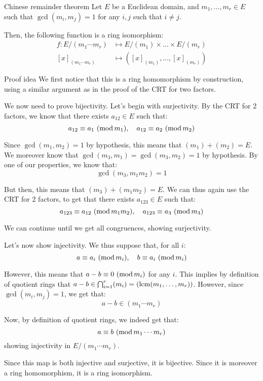 \documentclass[a4paper]{article}
\begin{document}
\begin{parag}{Chinese remainder theorem}
    Let $E$ be a Euclidean domain, and $m_1, \ldots, m_r \in E$ such that $\gcd\left(m_i, m_j\right) = 1$ for any $i, j$ such that $i \neq j$.

    Then, the following function is a ring isomorphism: 
    \[\begin{split}
    f: E / \left(m_1 \cdots m_r\right) &\longmapsto E / \left(m_1\right) \times \ldots \times E / \left(m_r\right) \\
    \left[x\right]_{\left(m_1 \cdots m_r\right)} &\longmapsto \left(\left[x\right]_{\left(m_1\right)}, \ldots, \left[x\right]_{\left(m_r\right)}\right)
    \end{split}\]
    
    \begin{subparag}{Proof idea}
        We first notice that this is a ring homomorphism by construction, using a similar argument as in the proof of the CRT for two factors.

        We now need to prove bijectivity. Let's begin with surjectivity. By the CRT for 2 factors, we know that there exists $a_{12} \in E$ such that: 
        \[a_{12} \equiv a_1\ (\operatorname{mod} m_1), \quad a_{12} \equiv a_2\ (\operatorname{mod} m_2)\]
        
        Since $\gcd\left(m_1, m_2\right) = 1$ by hypothesis, this means that $\left(m_1\right) + \left(m_2\right) = E$. We moreover know that $\gcd\left(m_3, m_1\right) = \gcd\left(m_3, m_2\right) = 1$ by hypothesis. By one of our properties, we know that: 
        \[\gcd\left(m_3, m_1 m_2\right) = 1\]
        
        But then, this means that $\left(m_3\right) + \left(m_1 m_2\right) = E$. We can thus again use the CRT for 2 factors, to get that there exists $a_{123} \in E$ such that: 
        \[a_{123} \equiv a_{12}\ (\operatorname{mod} m_1m_2), \quad a_{123} \equiv a_3\ (\operatorname{mod} m_3)\]
        
        We can continue until we get all congruences, showing surjectivity.

        Let's now show injectivity. We thus suppose that, for all $i$: 
        \[a \equiv a_i\ (\operatorname{mod} m_i), \quad b \equiv a_i\ (\operatorname{mod} m_i)\]
        
        However, this means that $a-b \equiv 0\ (\operatorname{mod} m_i)$ for any $i$. This implies by definition of quotient rings that $a - b \in \bigcap_{i=1}^{r} \left(m_i\right) = \left(\lcm\left(m_1, \ldots, m_r\right)\right)$. However, since $\gcd\left(m_i, m_j\right) = 1$, we get that:
        \[a - b \in \left(m_1 \cdots m_r\right)\]

        Now, by definition of quotient rings, we indeed get that: 
        \[a \equiv b\ (\operatorname{mod} m_1 \cdots m_r)\]
        showing injectivity in $E / \left(m_1 \cdots m_r\right)$.

        Since this map is both injective and surjective, it is bijective. Since it is moreover a ring homomorphism, it is a ring isomorphism.
    \end{subparag}
\end{parag}
\end{document}
